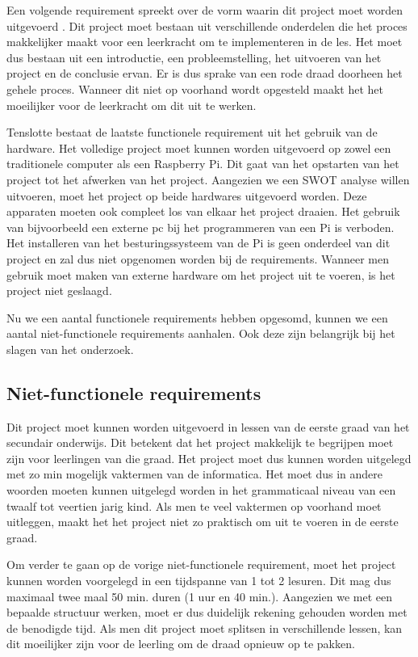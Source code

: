 Een volgende requirement spreekt over de vorm waarin dit project moet worden uitgevoerd . Dit project moet bestaan uit verschillende onderdelen die het proces makkelijker maakt voor een leerkracht om te implementeren in de les. Het moet dus bestaan uit een introductie, een  probleemstelling, het uitvoeren van het project en de conclusie ervan. Er is dus sprake van een rode draad doorheen het gehele proces. Wanneer dit niet op voorhand wordt opgesteld maakt het het moeilijker voor de leerkracht om dit uit te werken. 

Tenslotte bestaat de laatste functionele requirement uit het gebruik van de hardware. Het volledige project moet kunnen worden uitgevoerd op zowel een traditionele computer als een Raspberry Pi. Dit gaat van het opstarten van het project tot het afwerken van het project. Aangezien we een SWOT analyse willen uitvoeren, moet het project op beide hardwares uitgevoerd worden. Deze apparaten moeten ook compleet los van elkaar het project draaien. Het gebruik van bijvoorbeeld een externe pc bij het programmeren van een Pi is verboden. Het installeren van het besturingssysteem van de Pi is geen onderdeel van dit project en zal dus niet opgenomen worden bij de requirements. Wanneer men gebruik moet maken van externe hardware om het project uit te voeren, is het project niet geslaagd.

Nu we een aantal functionele requirements hebben opgesomd, kunnen we een aantal niet-functionele requirements aanhalen. Ook deze zijn belangrijk bij het slagen van het onderzoek.

\subsection{Niet-functionele requirements}

Dit project moet kunnen worden uitgevoerd in lessen van de eerste graad van het secundair onderwijs. Dit betekent dat het project makkelijk te begrijpen moet zijn voor leerlingen van die graad. Het project moet dus kunnen worden uitgelegd met zo min mogelijk vaktermen van de informatica. Het moet dus in andere woorden moeten kunnen uitgelegd worden in het grammaticaal niveau van een twaalf tot veertien jarig kind. Als men te veel vaktermen op voorhand moet uitleggen, maakt het het project niet zo praktisch om uit te voeren in de eerste graad.

Om verder te gaan op de vorige niet-functionele requirement, moet het project kunnen worden voorgelegd in een tijdspanne van 1 tot 2 lesuren. Dit mag dus maximaal twee maal 50 min. duren (1 uur en 40 min.). Aangezien we met een bepaalde structuur werken, moet er dus duidelijk rekening gehouden worden met de benodigde tijd. Als men dit project moet splitsen in verschillende lessen, kan dit moeilijker zijn voor de leerling om de draad opnieuw op te pakken.

